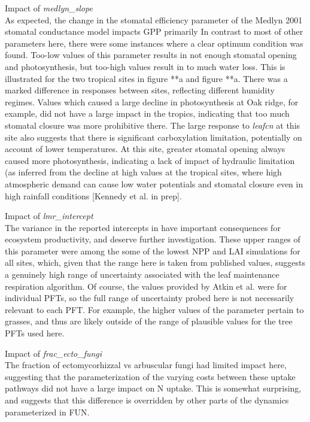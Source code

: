 \documentclass[draft,linenumbers]{agujournal}
\begin{document}
Impact of \emph{medlyn\_slope}\\
As expected, the change in the stomatal efficiency parameter of the Medlyn 2001 stomatal conductance model impacts GPP primarily In contrast to most of other parameters here, there were some instances where a clear optimum condition was found. Too-low values of this parameter results in not enough stomatal opening and photosynthesis, but too-high values result in to much water loss. This is illustrated for the two tropical sites in figure **a and figure **a. There was a marked difference in responses between sites, reflecting different humidity regimes. Values which caused a large decline in photosynthesis at Oak ridge, for example, did not have a large impact in the tropics, indicating that too much stomatal closure was more prohibitive there. The large response to \emph{leafcn} at this site also suggests that there is significant carboxylation limitation, potentially on account of lower temperatures. At this site, greater stomatal opening always caused more photosynthesis, indicating a lack of impact of hydraulic limitation (as inferred from the decline at high values at the tropical sites, where high atmospheric demand can cause low water potentials and stomatal closure even in high rainfall conditions [Kennedy et al. in prep].

Impact of \emph{lmr\_intercept}\\
The variance in the reported intercepts in \cite{atkin2016} have important consequences for ecosystem productivity, and deserve further investigation. These upper ranges of this parameter were among the some of the lowest NPP and LAI simulations for all sites, which, given that the range here is taken from published values, suggests a genuinely high range of uncertainty associated with the leaf maintenance respiration algorithm. Of course, the values provided by Atkin et al. were for individual PFTs, so the full range of uncertainty probed here is not necessarily relevant to each PFT. For example, the higher values of the parameter pertain to grasses, and thus are likely outside of the range of plausible values for the tree PFTs used here. 

Impact of \emph{frac\_ecto\_fungi}\\
The fraction of ectomycorhizzal vs arbuscular fungi had limited impact here, suggesting that the parameterization of the varying costs between these uptake pathways did not have a large impact on N uptake. This is somewhat surprising, and suggests that this difference is overridden by other parts of the dynamics parameterized in FUN.
\end{document}
